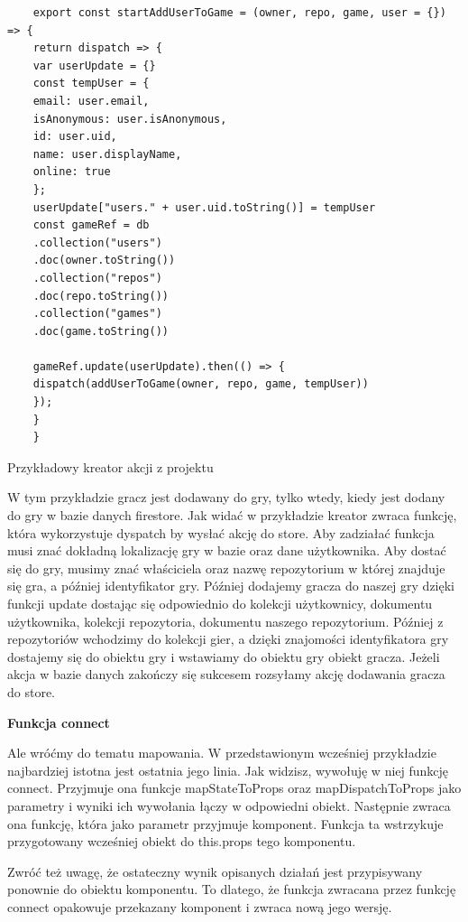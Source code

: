 \begin{listing}
	\begin{verbatim}
	export const startAddUserToGame = (owner, repo, game, user = {}) => {
	return dispatch => {
	var userUpdate = {}
	const tempUser = {
	email: user.email,
	isAnonymous: user.isAnonymous,
	id: user.uid,
	name: user.displayName,
	online: true
	};
	userUpdate["users." + user.uid.toString()] = tempUser
	const gameRef = db
	.collection("users")
	.doc(owner.toString())
	.collection("repos")
	.doc(repo.toString())
	.collection("games")
	.doc(game.toString())
	
	gameRef.update(userUpdate).then(() => {
	dispatch(addUserToGame(owner, repo, game, tempUser))
	});
	}
	}
	\end{verbatim}
	\caption{Przykładowy kreator akcji z projektu} \label{listing:moj}
\end{listing}

W tym przykładzie gracz jest dodawany do gry, tylko wtedy, kiedy jest dodany do gry w bazie danych firestore. Jak widać w przykładzie kreator zwraca funkcję, która wykorzystuje dyspatch by wysłać akcję do store. Aby zadziałać funkcja musi znać dokładną lokalizację gry w bazie oraz dane użytkownika. Aby dostać się do gry, musimy znać właściciela oraz nazwę repozytorium w której znajduje się gra, a później identyfikator gry. Później dodajemy gracza do naszej gry dzięki funkcji update dostając się odpowiednio do kolekcji użytkownicy, dokumentu użytkownika, kolekcji repozytoria, dokumentu naszego repozytorium. Później z repozytoriów wchodzimy do kolekcji gier, a dzięki znajomości identyfikatora gry dostajemy się do obiektu gry i wstawiamy do obiektu gry obiekt gracza. Jeżeli akcja w bazie danych zakończy się sukcesem rozsyłamy akcję dodawania gracza do store.\cite{www_nafrontendzie}
\begin{center}
	\textbf{Funkcja connect}
\end{center}
Ale wróćmy do tematu mapowania. W przedstawionym wcześniej przykładzie najbardziej istotna jest ostatnia jego linia. Jak widzisz, wywołuję w niej funkcję connect. Przyjmuje ona funkcje mapStateToProps oraz mapDispatchToProps jako parametry i wyniki ich wywołania łączy w odpowiedni obiekt. Następnie zwraca ona funkcję, która jako parametr przyjmuje komponent. Funkcja ta wstrzykuje przygotowany wcześniej obiekt do this.props tego komponentu.

Zwróć też uwagę, że ostateczny wynik opisanych działań jest przypisywany ponownie do obiektu komponentu. To dlatego, że funkcja zwracana przez funkcję connect opakowuje przekazany komponent i zwraca nową jego wersję.

